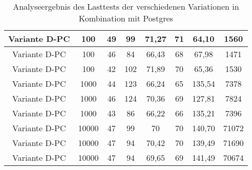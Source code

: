 \begin{landscape}
\begin{table}[h!]
\begin{tabular}{ |c|c|c|c|c|c|c|c|}
			Variante D-PC & 100 & 49 & 99 & 71,27 & 71 & 64,10 & 1560 \\ 
			\hline
			Variante D-PC & 100 & 46 & 84 & 66,43 & 68 & 67,98 & 1471 \\ 
			\hline
			Variante D-PC & 100 & 42 & 102 & 71,89 & 70 & 65,36 & 1530 \\ 
			\hline
			
			Variante D-PC & 1000 & 44 & 123 & 66,24 & 65 & 135,54 & 7378 \\ 
			\hline
			Variante D-PC & 1000 & 46 & 124 & 70,36 & 69 & 127,81 & 7824 \\ 
			\hline
			Variante D-PC & 1000 & 43 & 86 & 66,22 & 66 & 135,21 & 7396 \\ 
			\hline
			
			Variante D-PC & 10000 & 47 & 99 & 70 & 70 & 140,70 & 71072 \\ 
			\hline
			Variante D-PC & 10000 & 47 & 94 & 70,42 & 70 & 139,49 & 71690 \\ 
			\hline
			Variante D-PC & 10000 & 47 & 94 & 69,65 & 69 & 141,49 & 70674 \\ 
			\hline
		\end{tabular}
		\caption{Analyseergebnis des Lasttests der verschiedenen Variationen in Kombination mit Postgres}
		\label{fig:performance-postgres}
	\end{table}
\end{landscape}

